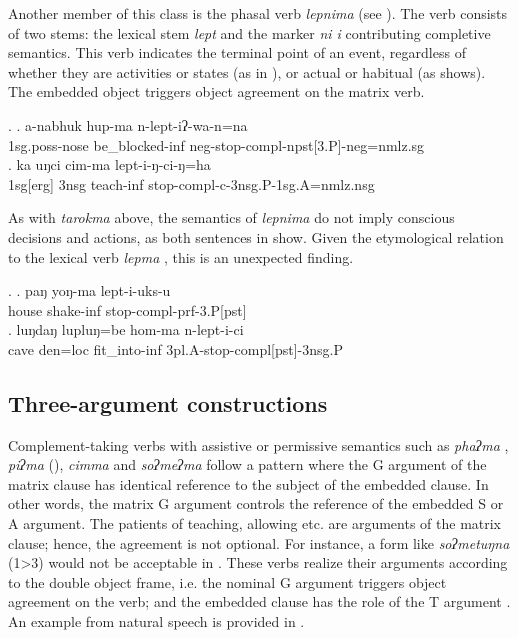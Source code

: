 Another member of this class is the phasal verb \emph{lepnima}   (see \Next). The verb consists of two stems: the lexical stem \emph{lept}  and the marker \emph{ni \ti i} contributing completive semantics. This verb indicates the terminal point of an event, regardless of whether  they are activities or states (as in \Next[a]), or actual or habitual (as \Next[b] shows).  The embedded object triggers object agreement on the matrix verb.

\ex. \ag. a-nabhuk hup-ma n-lept-iʔ-wa-n=na\\
{\sc 1sg.poss}-nose be\_blocked{\sc -inf} {\sc neg}-stop{\sc [3sg.A]-compl-npst[3.P]-neg=nmlz.sg}\\
\bg. ka uŋci cim-ma lept-i-ŋ-ci-ŋ=ha\\
{\sc 1sg[erg]} {\sc 3nsg} teach{\sc -inf} stop-{\sc compl-c-3nsg.P-1sg.A=nmlz.nsg}\\

As with \emph{tarokma} above, the semantics of \emph{lepnima} do not imply conscious decisions and actions, as both sentences in \Next show. Given the etymological relation to the lexical verb \emph{lepma} , this is an unexpected finding. 

\ex. \ag. paŋ  yoŋ-ma     lept-i-uks-u\\
house shake{\sc -inf} stop{\sc [3sg.A]-compl-prf-3.P[pst]}\\
 
\bg. luŋdaŋ  lupluŋ=be    hom-ma n-lept-i-ci\\
cave den{\sc =loc} fit\_into-{\sc inf} {\sc 3pl.A-}stop-{\sc compl[pst]-3nsg.P}\\
 



\subsection{Three-argument constructions}	
		
 Complement-taking  verbs with assistive or permissive semantics such as \emph{phaʔma} , \emph{piʔma}  (), \emph{cimma}  and \emph{soʔmeʔma}  follow a pattern where the G argument of the matrix clause has identical reference to the subject of the embedded clause. In other words, the matrix G argument controls the reference of the embedded S or A argument. The patients of teaching, allowing etc. are arguments of the  matrix clause; hence, the agreement is not optional. For instance, a form like \emph{soʔmetuŋna} (1>3) would not be acceptable in \Next[b]. 
 These verbs realize their arguments according to the double object frame, i.e. the nominal G argument triggers object agreement on the verb; and the embedded clause has the role of the T argument \Next. An example from natural speech is provided in \Next[c]. 
 

